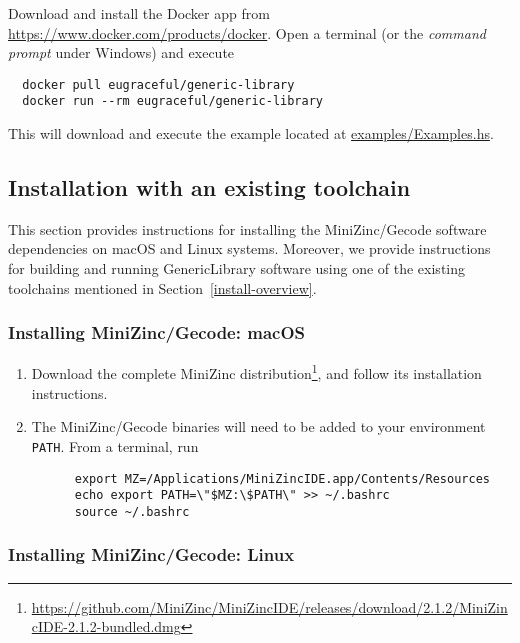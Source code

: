 Download and install the Docker app from \url{https://www.docker.com/products/docker}.
%
Open a terminal (or the \emph{command prompt} under Windows) and
execute
\begin{verbatim}
  docker pull eugraceful/generic-library
  docker run --rm eugraceful/generic-library
\end{verbatim}

This will download and execute the example located at
\href{https://github.com/GRACeFUL-project/GenericLibrary/blob/master/examples/Examples.hs}{examples/Examples.hs}.

\subsection{Installation with an existing toolchain}
\label{install-minizinc}

This section provides instructions for installing the MiniZinc/Gecode
software dependencies on macOS and Linux systems.
%
Moreover, we provide instructions for building and running
GenericLibrary software using one of the existing toolchains mentioned
in Section~\ref{install-overview}.


\subsubsection{Installing MiniZinc/Gecode: macOS}

\begin{enumerate}
\item Download the complete MiniZinc
  distribution\footnote{\url{https://github.com/MiniZinc/MiniZincIDE/releases/download/2.1.2/MiniZincIDE-2.1.2-bundled.dmg}},
  and follow its installation instructions.
\item The MiniZinc/Gecode binaries will need to be added to your
  environment \verb+PATH+. From a terminal, run
%
    \begin{verbatim}
      export MZ=/Applications/MiniZincIDE.app/Contents/Resources
      echo export PATH=\"$MZ:\$PATH\" >> ~/.bashrc
      source ~/.bashrc
    \end{verbatim}
\end{enumerate}


\subsubsection{Installing MiniZinc/Gecode: Linux}

